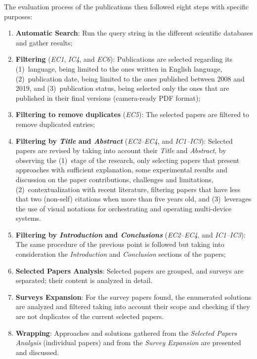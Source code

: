 The evaluation process of the publications then followed eight steps with specific purposes:

\begin{enumerate}
    \item \textbf{Automatic Search}: Run the query string in the different scientific databases and gather results;
    \item \textbf{Filtering} (\textit{EC1}, \textit{IC4}, and \textit{EC6}): Publications are selected regarding its (1)~language, being limited to the ones written in English language, (2)~publication date, being limited to the ones published between 2008 and 2019, and (3)~publication status, being selected only the ones that are published in their final versions (camera-ready PDF format);
    \item \textbf{Filtering to remove duplicates} (\textit{EC5}):  The selected papers are filtered to remove duplicated entries;
    \item \textbf{Filtering by \textit{Title} and \textit{Abstract}} (\textit{EC2--EC4}, and \textit{IC1--IC3}): Selected papers are revised by taking into account their \textit{Title} and \textit{Abstract}, by observing the (1)~stage of the research, only selecting papers that present approaches with sufficient explanation, some experimental results and discussion on the paper contributions, challenges and limitations, (2)~contextualization with recent literature, filtering papers that have less that two (non-self) citations when more than five years old, and (3)~leverages the use of visual notations for orchestrating and operating multi-device systems.
    \item \textbf{Filtering by \textit{Introduction} and \textit{Conclusions}} (\textit{EC2--EC4}, and \textit{IC1--IC3}): The same procedure of the previous point is followed but taking into consideration the \textit{Introduction} and \textit{Conclusion} sections of the papers;
    \item \textbf{Selected Papers Analysis}: Selected papers are grouped, and surveys are separated;  their content is analyzed in detail.
    \item \textbf{Surveys Expansion}: For the survey papers found, the enumerated solutions are analyzed and filtered taking into account their scope
    and checking if they are not duplicates of the current selected papers. 
    \item \textbf{Wrapping}: Approaches and solutions gathered from the \textit{Selected Papers Analysis} (individual papers) and from the \textit{Survey Expansion} are presented and discussed.
\end{enumerate}

